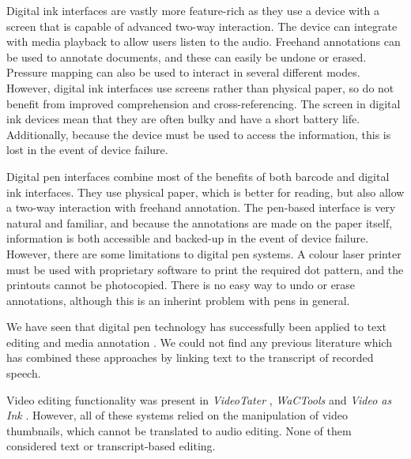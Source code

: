 Digital ink interfaces are vastly more feature-rich as they use a device with a screen that is capable of advanced
two-way interaction. The device can integrate with media playback to allow users listen to the audio. Freehand
annotations can be used to annotate documents, and these can easily be undone or erased. Pressure mapping can also be
used to interact in several different modes.  However, digital ink interfaces use screens rather than physical paper,
so do not benefit from improved comprehension and cross-referencing. The screen in digital ink devices mean that they
are often bulky and have a short battery life. Additionally, because the device must be used to access the information,
this is lost in the event of device failure.

Digital pen interfaces combine most of the benefits of both barcode and digital ink interfaces. They use physical
paper, which is better for reading, but also allow a two-way interaction with freehand annotation. The pen-based
interface is very natural and familiar, and because the annotations are made on the paper itself, information is both
accessible and backed-up in the event of device failure. However, there are some limitations to digital pen systems.
A colour laser printer must be used with proprietary software to print the required dot pattern, and the printouts
cannot be photocopied. There is no easy way to undo or erase annotations, although this is an inherint problem with
pens in general.


We have seen that digital pen technology has successfully been applied to text editing \citep{Weibel2008} and media
annotation \citep{Fouse2011}. We could not find any previous literature which has combined these approaches by linking
text to the transcript of recorded speech.

Video editing functionality was present in \textit{VideoTater} \citep{Diakopoulos2006}, \textit{WaCTools}
\citep{Cattelan2008} and \textit{Video as Ink} \citep{Cabral2016}. However, all of these systems relied on the
manipulation of video thumbnails, which cannot be translated to audio editing. None of them considered text or
transcript-based editing.

